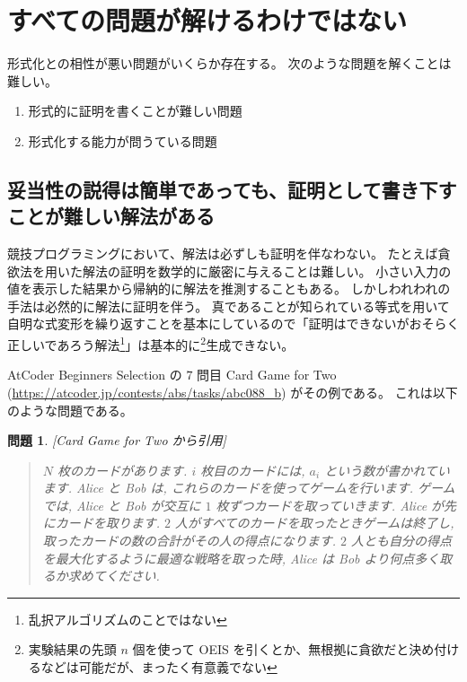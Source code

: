 \documentclass{ltjsarticle}
\newtheorem{problem*}{問題}[section]
\newenvironment{problem}{\begin{problem*}\renewcommand{\qedsymbol}{\(\diamond\)}\pushQED{\qed}}{\popQED\end{problem*}}
\begin{document}
\section{すべての問題が解けるわけではない}

形式化との相性が悪い問題がいくらか存在する。
次のような問題を解くことは難しい。

\begin{enumerate}
    \item 形式的に証明を書くことが難しい問題
    \item 形式化する能力が問うている問題
\end{enumerate}

\subsection{妥当性の説得は簡単であっても、証明として書き下すことが難しい解法がある}

競技プログラミングにおいて、解法は必ずしも証明を伴なわない。
たとえば貪欲法を用いた解法の証明を数学的に厳密に与えることは難しい。
小さい入力の値を表示した結果から帰納的に解法を推測することもある。
しかしわれわれの手法は必然的に解法に証明を伴う。
真であることが知られている等式を用いて自明な式変形を繰り返すことを基本にしているので「証明はできないがおそらく正しいであろう解法\footnote{乱択アルゴリズムのことではない}」は基本的に\footnote{実験結果の先頭 $n$ 個を使って OEIS を引くとか、無根拠に貪欲だと決め付けるなどは可能だが、まったく有意義でない}生成できない。

AtCoder Beginners Selection の $7$ 問目 Card Game for Two (\url{https://atcoder.jp/contests/abs/tasks/abc088_b}) がその例である。
これは以下のような問題である。

\begin{problem}[Card Game for Two から引用]
    \label{card-game-for-two}
    \begin{quotation}
        $N$ 枚のカードがあります.
        $i$ 枚目のカードには, $a_i$ という数が書かれています.
        Alice と Bob は, これらのカードを使ってゲームを行います.
        ゲームでは, Alice と Bob が交互に $1$ 枚ずつカードを取っていきます.
        Alice が先にカードを取ります.
        $2$ 人がすべてのカードを取ったときゲームは終了し, 取ったカードの数の合計がその人の得点になります.
        $2$ 人とも自分の得点を最大化するように最適な戦略を取った時, Alice は Bob より何点多く取るか求めてください.
    \end{quotation}
\end{problem}
\end{document}
